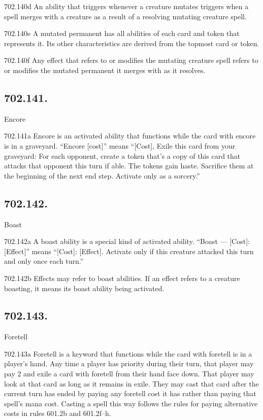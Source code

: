 702.140d An ability that triggers whenever a creature mutates triggers when a spell merges with a creature as a result of a resolving mutating creature spell.

702.140e A mutated permanent has all abilities of each card and token that represents it. Its other characteristics are derived from the topmost card or token.

702.140f Any effect that refers to or modifies the mutating creature spell refers to or modifies the mutated permanent it merges with as it resolves.

\subsection*{702.141.}
Encore

702.141a Encore is an activated ability that functions while the card with encore is in a graveyard. “Encore [cost]” means “[Cost], Exile this card from your graveyard: For each opponent, create a token that’s a copy of this card that attacks that opponent this turn if able. The tokens gain haste. Sacrifice them at the beginning of the next end step. Activate only as a sorcery.”

\subsection*{702.142.}
Boast

702.142a A boast ability is a special kind of activated ability. “Boast — [Cost]: [Effect]” means “[Cost]: [Effect]. Activate only if this creature attacked this turn and only once each turn.”

702.142b Effects may refer to boast abilities. If an effect refers to a creature boasting, it means its boast ability being activated.

\subsection*{702.143.}
Foretell

702.143a Foretell is a keyword that functions while the card with foretell is in a player’s hand. Any time a player has priority during their turn, that player may pay {2} and exile a card with foretell from their hand face down. That player may look at that card as long as it remains in exile. They may cast that card after the current turn has ended by paying any foretell cost it has rather than paying that spell’s mana cost. Casting a spell this way follows the rules for paying alternative costs in rules 601.2b and 601.2f–h.

